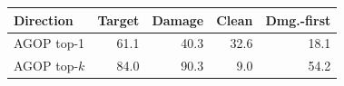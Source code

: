 \begin{center}
\centering
\small
{}
\label{tab:agop-boundary}
\begin{tabular}{lrrrr}
\toprule
Direction & Target & Damage & Clean & Dmg.-first \\
\midrule
AGOP top-1 & 61.1 & 40.3 & 32.6 & 18.1 \\
AGOP top-$k$ & 84.0 & 90.3 & 9.0 & 54.2 \\
\bottomrule
\end{tabular}
\end{center}
